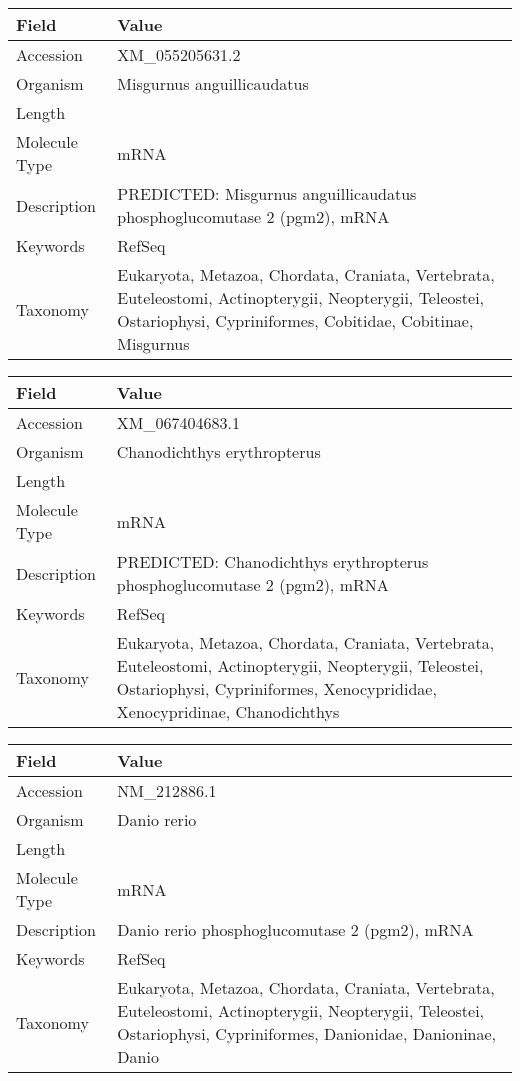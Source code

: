 \documentclass[10pt]{article}
\begin{document}
\vspace{1em}
{\footnotesize
\begin{longtable}{>{\raggedright\arraybackslash}p{4.5cm} >{\raggedright\arraybackslash}p{11.5cm}}
\textbf{Field} & \textbf{Value} \\
\hline
Accession & XM\_055205631.2 \\
Organism & Misgurnus anguillicaudatus \\
Length & 2292 \\
Molecule Type & mRNA \\
Description & PREDICTED: Misgurnus anguillicaudatus phosphoglucomutase 2 (pgm2), mRNA \\
Keywords & RefSeq \\
Taxonomy & Eukaryota, Metazoa, Chordata, Craniata, Vertebrata, Euteleostomi, Actinopterygii, Neopterygii, Teleostei, Ostariophysi, Cypriniformes, Cobitidae, Cobitinae, Misgurnus \\
\end{longtable}
}

\vspace{1em}
{\footnotesize
\begin{longtable}{>{\raggedright\arraybackslash}p{4.5cm} >{\raggedright\arraybackslash}p{11.5cm}}
\textbf{Field} & \textbf{Value} \\
\hline
Accession & XM\_067404683.1 \\
Organism & Chanodichthys erythropterus \\
Length & 2805 \\
Molecule Type & mRNA \\
Description & PREDICTED: Chanodichthys erythropterus phosphoglucomutase 2 (pgm2), mRNA \\
Keywords & RefSeq \\
Taxonomy & Eukaryota, Metazoa, Chordata, Craniata, Vertebrata, Euteleostomi, Actinopterygii, Neopterygii, Teleostei, Ostariophysi, Cypriniformes, Xenocyprididae, Xenocypridinae, Chanodichthys \\
\end{longtable}
}

\vspace{1em}
{\footnotesize
\begin{longtable}{>{\raggedright\arraybackslash}p{4.5cm} >{\raggedright\arraybackslash}p{11.5cm}}
\textbf{Field} & \textbf{Value} \\
\hline
Accession & NM\_212886.1 \\
Organism & Danio rerio \\
Length & 3462 \\
Molecule Type & mRNA \\
Description & Danio rerio phosphoglucomutase 2 (pgm2), mRNA \\
Keywords & RefSeq \\
Taxonomy & Eukaryota, Metazoa, Chordata, Craniata, Vertebrata, Euteleostomi, Actinopterygii, Neopterygii, Teleostei, Ostariophysi, Cypriniformes, Danionidae, Danioninae, Danio \\
\end{longtable}
}
\end{document}
